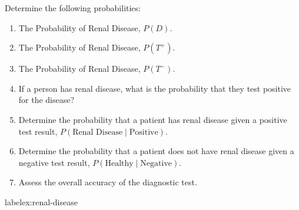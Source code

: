 \begin{example}
        Determine the following probabilities:
        \begin{enumerate}[label=(\alph*)]
            \item The Probability of Renal Disease, $P(D)$.
            \item The Probability of Renal Disease,  \( P(T^+) \).
            \item The Probability of Renal Disease,  \( P(T^-) \).
            \item If a person has renal disease, what is the probability that they test positive for the disease?
            \item Determine the probability that a patient has renal disease given a positive test result, \( P(\text{Renal Disease} \mid \text{Positive}) \).
            \item Determine the probability that a patient does not have renal disease given a negative test result, \( P(\text{Healthy} \mid \text{Negative}) \).
            \item Assess the overall accuracy of the diagnostic test.
        \end{enumerate}
        label{ex:renal-disease}
\end{example}

